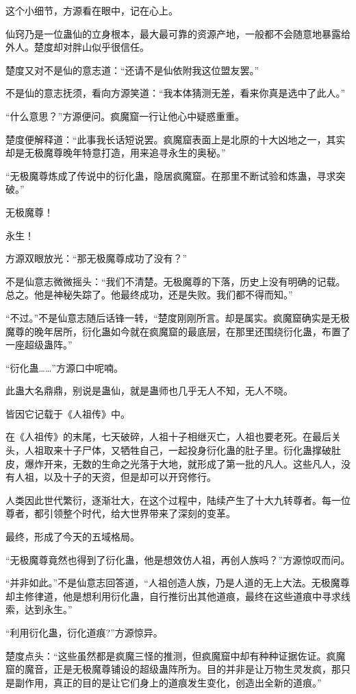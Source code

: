 \begin{this_body}
这个小细节，方源看在眼中，记在心上。

仙窍乃是一位蛊仙的立身根本，最大最可靠的资源产地，一般都不会随意地暴露给外人。楚度却对胖山似乎很信任。

楚度又对不是仙的意志道：“还请不是仙依附我这位盟友罢。”

不是仙的意志抚须，看向方源笑道：“我本体猜测无差，看来你真是选中了此人。”

“什么意思？”方源便问。疯魔窟一行让他心中疑惑重重。

楚度便解释道：“此事我长话短说罢。疯魔窟表面上是北原的十大凶地之一，其实却是无极魔尊晚年特意打造，用来追寻永生的奥秘。”

“无极魔尊炼成了传说中的衍化蛊，隐居疯魔窟。在那里不断试验和炼蛊，寻求突破。”

无极魔尊！

永生！

方源双眼放光：“那无极魔尊成功了没有？”

不是仙意志微微摇头：“我们不清楚。无极魔尊的下落，历史上没有明确的记载。总之。他是神秘失踪了。他最终成功，还是失败。我们都不得而知。”

“不过。”不是仙意志随后话锋一转，“楚度刚刚所言。却是属实。疯魔窟确实是无极魔尊的晚年居所，衍化蛊如今就在疯魔窟的最底层，在那里还围绕衍化蛊，布置了一座超级蛊阵。”

“衍化蛊……”方源口中呢喃。

此蛊大名鼎鼎，别说是蛊仙，就是蛊师也几乎无人不知，无人不晓。

皆因它记载于《人祖传》中。

在《人祖传》的末尾，七天破碎，人祖十子相继灭亡，人祖也要老死。在最后关头，人祖取来十子尸体，又牺牲自己，一起投身衍化蛊的肚子里。衍化蛊撑破肚皮，爆炸开来，无数的生命之光落于大地，就形成了第一批的凡人。这些凡人，没有人祖，以及十子的天资，但是却可以开窍修行。

人类因此世代繁衍，逐渐壮大，在这个过程中，陆续产生了十大九转尊者。每一位尊者，都引领整个时代，给大世界带来了深刻的变革。

最终，形成了今天的五域格局。

“无极魔尊竟然也得到了衍化蛊，他是想效仿人祖，再创人族吗？”方源惊叹而问。

“并非如此。”不是仙意志回答道，“人祖创造人族，乃是人道的无上大法。无极魔尊却主修律道，他是想利用衍化蛊，自行推衍出其他道痕，最终在这些道痕中寻求线索，达到永生。”

“利用衍化蛊，衍化道痕?”方源惊异。

楚度点头：“这些虽然都是疯魔三怪的推测，但疯魔窟中却有种种证据佐证。疯魔窟的魔音，正是无极魔尊铺设的超级蛊阵所为。目的并非是让万物生灵发疯，那只是副作用，真正的目的是让它们身上的道痕发生变化，创造出全新的道痕。”


\end{this_body}
